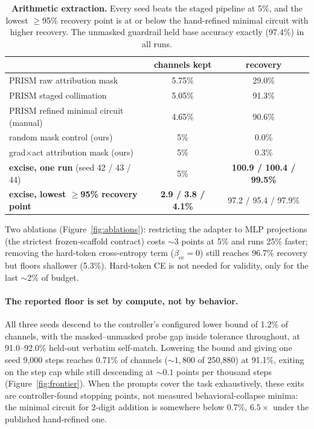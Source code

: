 \documentclass{article}
\begin{document}
\begin{table}[h]
\centering\small
\caption{\textbf{Arithmetic extraction.} Every seed beats the staged
pipeline at 5\%, and the lowest $\geq$95\% recovery point is at or below the
hand-refined minimal circuit with higher recovery. The unmasked guardrail
held base accuracy exactly (97.4\%) in all runs.}
\label{tab:arith}
\begin{tabular}{lcc}
\toprule
 & channels kept & recovery \\
\midrule
PRISM raw attribution mask & 5.75\% & 29.0\% \\
PRISM staged collimation & 5.05\% & 91.3\% \\
PRISM refined minimal circuit (manual) & 4.65\% & 90.6\% \\
\midrule
random mask control (ours) & 5\% & 0.0\% \\
grad$\times$act attribution mask (ours) & 5\% & 0.3\% \\
\textbf{excise, one run} (seed 42 / 43 / 44) & 5\% & \textbf{100.9 / 100.4 / 99.5\%} \\
\textbf{excise, lowest $\geq$95\% recovery point} & \textbf{2.9 / 3.8 / 4.1\%} & 97.2 / 95.4 / 97.9\% \\
\bottomrule
\end{tabular}
\end{table}

Two ablations (Figure~\ref{fig:ablations}): restricting the adapter to MLP
projections (the strictest frozen-scaffold contract) costs ${\sim}3$ points
at 5\% and runs 25\% faster; removing the hard-token cross-entropy term
($\beta_\mathrm{ce}{=}0$) still reaches 96.7\% recovery but floors shallower
(5.3\%). Hard-token CE is not needed for validity, only for the last
${\sim}2\%$ of budget.

\paragraph{The reported floor is set by compute, not by behavior.} All three seeds
descend to the controller's configured lower bound of 1.2\% of channels, with
the masked--unmasked probe gap inside tolerance throughout, at 91.0--92.0\%
held-out verbatim self-match. Lowering the bound and giving one seed 9{,}000
steps reaches 0.71\% of channels (${\sim}1{,}800$ of 250{,}880) at 91.1\%,
exiting on the step cap while still descending at ${\sim}0.1$ points per
thousand steps (Figure~\ref{fig:frontier}). When the prompts cover the task
exhaustively, these exits are controller-found stopping points, not measured
behavioral-collapse minima: the minimal circuit for 2-digit addition is
somewhere below 0.7\%, $6.5\times$ under the published hand-refined one.
\end{document}
